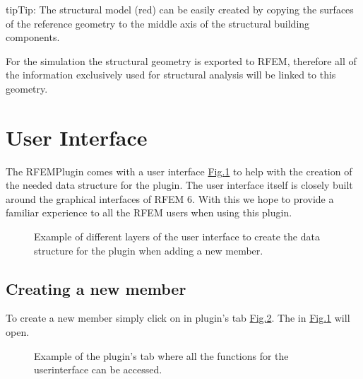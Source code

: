 \documentclass[letterpaper,10pt,english]{jupyterBook}
\let\sphinxpxdimen\pdfpxdimen\else\newdimen\sphinxpxdimen
\begin{document}
\begin{sphinxadmonition}{tip}{Tip:}
\sphinxAtStartPar
The structural model (red) can be easily created by copying the surfaces of the reference geometry to the middle axis
of the structural building components.
\end{sphinxadmonition}

\sphinxAtStartPar
For the simulation the structural geometry is exported to RFEM, therefore all of the information exclusively used for
structural analysis will be linked to this geometry.


\section{User Interface}
\label{\detokenize{Setting_up_a_problem:user-interface}}
\sphinxAtStartPar
The RFEM\sphinxhyphen{}Plugin comes with a user interface \hyperref[\detokenize{Setting_up_a_problem:ui-plugin}]{Fig.\@ \ref{\detokenize{Setting_up_a_problem:ui-plugin}}} to help with the creation of the needed data structure
for the plugin. The user interface itself is closely built around the graphical interfaces of RFEM 6. With this we hope
to provide a familiar experience to all the RFEM users when using this plugin.

\begin{figure}[htbp]
\centering
\capstart

\noindent\sphinxincludegraphics[height=500\sphinxpxdimen]{{ui_plugin}.png}
\caption{Example of different layers of the user interface to create the data structure for the plugin when adding a new member.}\label{\detokenize{Setting_up_a_problem:ui-plugin}}\end{figure}


\subsection{Creating a new member}
\label{\detokenize{Setting_up_a_problem:creating-a-new-member}}
\sphinxAtStartPar
To create a new member simply click on  in plugin’s tab \hyperref[\detokenize{Setting_up_a_problem:ui-member}]{Fig.\@ \ref{\detokenize{Setting_up_a_problem:ui-member}}}. The in \hyperref[\detokenize{Setting_up_a_problem:ui-plugin}]{Fig.\@ \ref{\detokenize{Setting_up_a_problem:ui-plugin}}} will
open.

\begin{figure}[htbp]
\centering
\capstart

\noindent\sphinxincludegraphics[height=200\sphinxpxdimen]{{ui_member}.png}
\caption{Example of the plugin’s tab where all the functions for the user\sphinxhyphen{}interface can be accessed.}\label{\detokenize{Setting_up_a_problem:ui-member}}\end{figure}
\end{document}
